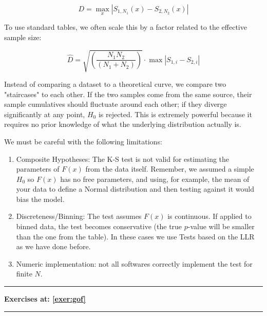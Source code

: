 	\[
	D = \max_x \left|S_{1,N_1}(x) - S_{2,N_2}(x)\right|
	\]
	
To use standard tables, we often scale this by a factor related to the effective sample size:

	\[
	\hat{D}=\sqrt{\left(\frac{N_1N_2}{\left(N_1+N_2\right)}\right)}\cdot\max\left|S_{1,i}-S_{2,i}\right|
	\]

Instead of comparing a dataset to a theoretical curve, we compare two "staircases" to each other. If the two samples come from the same source, their sample cumulatives should fluctuate around each other; if they diverge significantly at any point, $H_0$ is rejected. This is extremely powerful because it requires no prior knowledge of what the underlying distribution actually is.

We must be careful with the following limitations:

\begin{enumerate}
	\item Composite Hypotheses: The K-S test is not valid for estimating the parameters of $F(x)$ from the data itself. Remember, we assumed a simple $H_0$ so $F(x)$ has no free parameters, and using, for example, the mean of your data to define a Normal distribution and then testing against it would bias the model.
	\item Discreteness/Binning: The test assumes $F(x)$ is continuous. If applied to binned data, the test becomes conservative (the true $p$-value will be smaller than the one from the table). In these cases we use Tests based on the LLR as we have done before.
	\item Numeric implementation: not all softwares correctly implement the test for finite $N$.
\end{enumerate}

\vspace*{1cm}
\hrule
\begin{center}
	\textbf{Exercises at: \ref{exer:gof}}
\end{center}
\hrule
